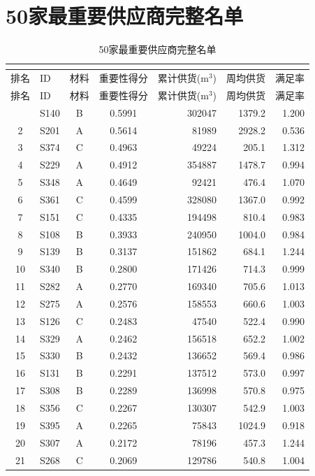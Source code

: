 \documentclass[12pt,a4paper]{ctexart}
\begin{document}
\section{50家最重要供应商完整名单}
\begin{longtable}{clccrrr}
\caption{50家最重要供应商完整名单}\\
\label{tab:top50full}\\
\toprule
排名 & ID & 材料 & 重要性得分 & 累计供货(m$^3$) & 周均供货 & 满足率 \\
\midrule
\endfirsthead
\toprule
排名 & ID & 材料 & 重要性得分 & 累计供货(m$^3$) & 周均供货 & 满足率 \\
\midrule
\endhead
\bottomrule
\endfoot
1 & S140 & B & 0.5991 & 302047 & 1379.2 & 1.200 \\
2 & S201 & A & 0.5614 & 81989 & 2928.2 & 0.536 \\
3 & S374 & C & 0.4963 & 49224 & 205.1 & 1.312 \\
4 & S229 & A & 0.4912 & 354887 & 1478.7 & 0.994 \\
5 & S348 & A & 0.4649 & 92421 & 476.4 & 1.070 \\
6 & S361 & C & 0.4599 & 328080 & 1367.0 & 0.992 \\
7 & S151 & C & 0.4335 & 194498 & 810.4 & 0.983 \\
8 & S108 & B & 0.3933 & 240950 & 1004.0 & 0.984 \\
9 & S139 & B & 0.3137 & 151862 & 684.1 & 1.244 \\
10 & S340 & B & 0.2800 & 171426 & 714.3 & 0.999 \\
11 & S282 & A & 0.2770 & 169340 & 705.6 & 1.013 \\
12 & S275 & A & 0.2576 & 158553 & 660.6 & 1.003 \\
13 & S126 & C & 0.2483 & 47540 & 522.4 & 0.990 \\
14 & S329 & A & 0.2462 & 156518 & 652.2 & 1.002 \\
15 & S330 & B & 0.2432 & 136652 & 569.4 & 0.986 \\
16 & S131 & B & 0.2291 & 137512 & 573.0 & 0.997 \\
17 & S308 & B & 0.2289 & 136998 & 570.8 & 0.975 \\
18 & S356 & C & 0.2267 & 130307 & 542.9 & 1.003 \\
19 & S395 & A & 0.2265 & 75843 & 1024.9 & 0.918 \\
20 & S307 & A & 0.2172 & 78196 & 457.3 & 1.244 \\
21 & S268 & C & 0.2069 & 129786 & 540.8 & 1.004 \\

\end{longtable}
\end{document}
